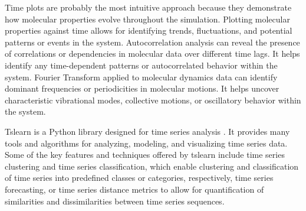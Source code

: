 \documentclass[9pt,bestpractices]{livecoms}
\begin{document}
Time plots are probably the most intuitive approach because they demonstrate how molecular properties evolve throughout the simulation. Plotting molecular properties against time allows for identifying trends, fluctuations, and potential patterns or events in the system. Autocorrelation analysis can reveal the presence of correlations or dependencies in molecular data over different time lags. It helps identify any time-dependent patterns or autocorrelated behavior within the system. Fourier Transform applied to molecular dynamics data can identify dominant frequencies or periodicities in molecular motions. It helps uncover characteristic vibrational modes, collective motions, or oscillatory behavior within the system.

Tslearn is a Python library designed for time series analysis \cite{RN13}. It provides many tools and algorithms for analyzing, modeling, and visualizing time series data. Some of the key features and techniques offered by tslearn include time series clustering and time series classification, which enable clustering and classification of time series into predefined classes or categories, respectively, time series forecasting, or time series distance metrics to allow for quantification of similarities and dissimilarities between time series sequences.


\clearpage




\end{document}
